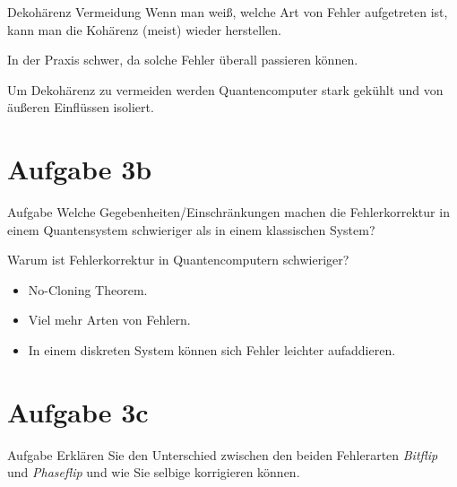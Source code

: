 \documentclass[fleqn,compress,utf8,aspectratio=169,t]{beamer}
\begin{document}
\begin{frame}{Dekohärenz Vermeidung}
Wenn man weiß, welche Art von Fehler aufgetreten ist, kann man die Kohärenz (meist) wieder herstellen.

In der Praxis schwer, da solche Fehler überall passieren können.

Um Dekohärenz zu vermeiden werden Quantencomputer stark gekühlt und von äußeren Einflüssen isoliert.
\end{frame}

\section{Aufgabe 3b}

\begin{frame}{Aufgabe}
Welche Gegebenheiten/Einschränkungen machen die Fehlerkorrektur in einem
Quantensystem schwieriger als in einem klassischen System?
\end{frame}

\begin{frame}{Warum ist Fehlerkorrektur in Quantencomputern schwieriger?}
\begin{itemize}
	\item No-Cloning Theorem.
	\item Viel mehr Arten von Fehlern.
	\item In einem diskreten System können sich Fehler leichter aufaddieren.
\end{itemize}
\end{frame}

\section{Aufgabe 3c}

\begin{frame}{Aufgabe}
Erklären Sie den Unterschied zwischen den beiden Fehlerarten \textit{Bitflip} und
\textit{Phaseflip} und wie Sie selbige korrigieren können.
\end{frame}
\end{document}
